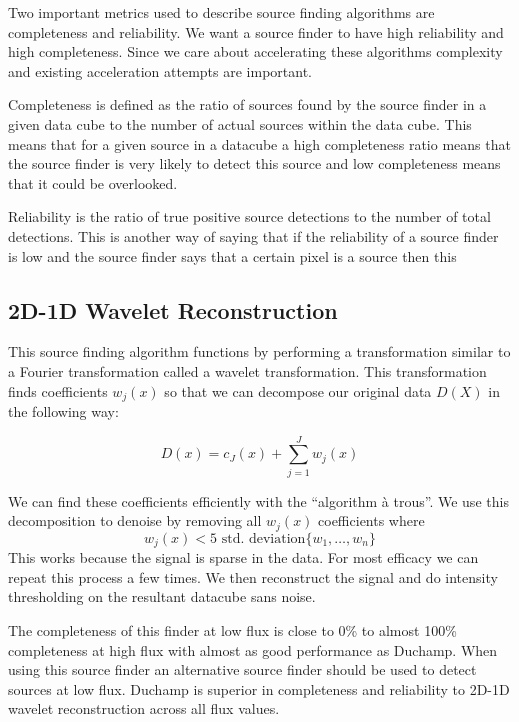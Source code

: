 \documentclass[prodmode,acmtecs]{acmsmall} \usepackage[ruled]{algorithm2e}
\begin{document}
    Two important metrics used to describe source finding algorithms are completeness and 
    reliability. We want a source finder to have high reliability and high completeness.
    Since we care about accelerating these algorithms complexity and existing 
    acceleration attempts are important.

    Completeness is defined as the ratio of sources found by the source finder
    in a given data cube to the number of actual sources within the data cube. This means that
    for a given source in a datacube a high completeness ratio means that the source finder is 
    very likely to detect this source and low completeness means that it could be overlooked.

    Reliability
    is the ratio of true positive source detections to the number of total detections. This is another
    way of saying that if the reliability of a source finder is low and the source finder says that a certain
    pixel is a source then this 


 \cite{westerlund2012assessing}
 \cite{popping2012comparison}

    \subsection{2D-1D Wavelet Reconstruction}
    This source finding algorithm functions by performing a transformation similar to a Fourier
    transformation called a wavelet transformation. This transformation finds coefficients $w_j(x)$
    so that we can decompose our original data $D(X)$ in the following way:

    $$D(x) = c_J(x) + \sum\limits_{j=1}^J w_j(x)$$
    
    We can find these coefficients efficiently with the ``algorithm \`{a} trous''. We
    use this decomposition to denoise by removing all $w_j(x)$ coefficients where $$w_j(x) < 5\text{ std. deviation}\{w_1, \ldots, w_n\}$$
    This works because the signal is sparse in the data. For most efficacy we can repeat this
    process a few times. We then reconstruct the signal and do intensity thresholding on the resultant
    datacube sans noise. 
    
    The completeness of this finder at low flux is close to 0\% 
    to almost 100\% completeness at high flux with almost as good performance as Duchamp. When using
    this source finder an alternative source finder should be used to detect sources at low flux. 
    Duchamp is superior in completeness and reliability to 2D-1D wavelet reconstruction across all flux values. 
    
\end{document}
